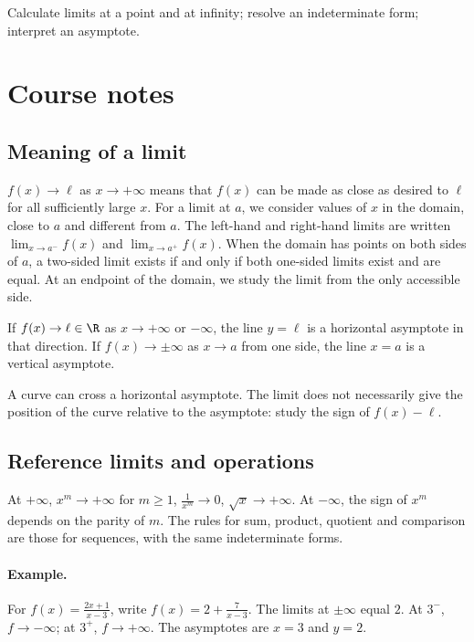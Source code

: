 \label{ch:3}


\begin{keypoint}[Objectives]Calculate limits at a point and at infinity; resolve an indeterminate form; interpret an asymptote.\end{keypoint}

\section{Course notes}
\subsection{Meaning of a limit}
$f(x)\to\ell$ as $x\to+\infty$ means that $f(x)$ can be made as close as desired to $\ell$ for all sufficiently large $x$. For a limit at $a$, we consider values of $x$ in the domain, close to $a$ and different from $a$. The left-hand and right-hand limits are written $\lim_{x\to a^-}f(x)$ and $\lim_{x\to a^+}f(x)$. When the domain has points on both sides of $a$, a two-sided limit exists if and only if both one-sided limits exist and are equal. At an endpoint of the domain, we study the limit from the only accessible side.
\begin{keypoint}
If $f(x)\to\ell\in\R$ as $x\to+\infty$ or $-\infty$, the line $y=\ell$ is a horizontal asymptote in that direction. If $f(x)\to\pm\infty$ as $x\to a$ from one side, the line $x=a$ is a vertical asymptote.
\end{keypoint}
A curve can cross a horizontal asymptote. The limit does not necessarily give the position of the curve relative to the asymptote: study the sign of $f(x)-\ell$.
\subsection{Reference limits and operations}
At $+\infty$, $x^m\to+\infty$ for $m\ge1$, $\frac{1}{x^m}\to0$, $\sqrt x\to+\infty$. At $-\infty$, the sign of $x^m$ depends on the parity of $m$. The rules for sum, product, quotient and comparison are those for sequences, with the same indeterminate forms.
\paragraph{Example.} For $f(x)=\frac{2x+1}{x-3}$, write $f(x)=2+\frac{7}{x-3}$. The limits at $\pm\infty$ equal $2$. At $3^-$, $f\to-\infty$; at $3^+$, $f\to+\infty$. The asymptotes are $x=3$ and $y=2$.
